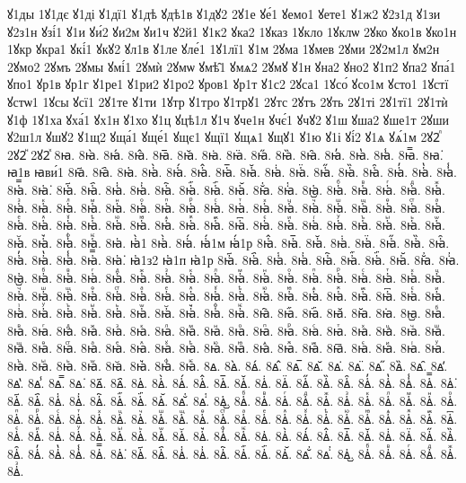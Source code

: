 {ꙋ1ды
1ꙋ1дє
ꙋ1ді
ꙋ1дї1
ꙋ1дѣ
ꙋдѣ1в
ꙋ1дꙋ2
2ꙋ1е
ꙋе́1
ꙋемо1
ꙋете1
ꙋ1ж2
ꙋ2з1д
ꙋ1зи
ꙋ2з1н
ꙋзі́1
ꙋ1и
ꙋи́2
ꙋи2м
ꙋи1ч
ꙋ2й1
ꙋ1к2
ꙋка2
1ꙋказ
1ꙋкло
1ꙋклѡ
2ꙋко
ꙋко1в
ꙋко1н
1ꙋкр
ꙋкра1
ꙋкі́1
ꙋкꙋ2
ꙋл1в
ꙋ1ле
ꙋле́1
1ꙋ1лї1
ꙋ1м
2ꙋма
1ꙋмев
2ꙋми
2ꙋ2м1л
ꙋм2н
2ꙋмо2
2ꙋмъ
2ꙋмы
ꙋмі́1
2ꙋмѝ
2ꙋмѡ
ꙋмѣ̑1
ꙋмѧ2
2ꙋмꙋ
ꙋ1н
ꙋна2
ꙋно2
ꙋ1п2
ꙋпа2
ꙋпа́1
ꙋпо1
ꙋр1в
ꙋр1г
ꙋ1ре1
ꙋ1ри2
ꙋ1ро2
ꙋров1
ꙋр1т
ꙋ1с2
2ꙋса1
1ꙋсо́
ꙋсо1м
ꙋсто1
1ꙋстї
ꙋстѡ1
1ꙋсы
ꙋсї1
2ꙋ1те
ꙋ1ти
1ꙋтр
ꙋ1тро
ꙋ1трꙋ1
2ꙋтс
2ꙋтъ
2ꙋть
2ꙋ1ті
2ꙋ1тї1
2ꙋ1тѝ
ꙋ1ф
1ꙋ1ха
ꙋха́1
ꙋх1н
ꙋ1хо
ꙋ1ц
ꙋцѣ1л
ꙋ1ч
ꙋче1н
ꙋчє́1
ꙋчꙋ2
ꙋ1ш
ꙋша2
ꙋше1т
2ꙋши
ꙋ2ш1л
ꙋшꙋ2
ꙋ1щ2
ꙋща́1
ꙋще́1
ꙋщє1
ꙋщї1
ꙋщѧ1
ꙋщꙋ1
ꙋ1ю
ꙋ1і
ꙋі́2
ꙋ1ѧ
ꙋѧ́1м
2ꙋ2ⷧ
2ꙋ2ⷩ
2ꙋ2ⷯ
8ꙗ.
8ꙗ̀.
8ꙗ́.
8ꙗ̂.
8ꙗ̅.
8ꙗ̆.
8ꙗ̇.
8ꙗ̈.
8ꙗ̋.
8ꙗ̏.
8ꙗ̑.
8ꙗ̓.
8ꙗ̔.
8ꙗ̾.
8ꙗ̿.
8ꙗ͘.
ꙗ1в
ꙗви́1
8ꙗ҃.
8ꙗ҄.
8ꙗ҅.
8ꙗ҅̀.
8ꙗ҅́.
8ꙗ҅̂.
8ꙗ҅̅.
8ꙗ҅̆.
8ꙗ҅̇.
8ꙗ҅̈.
8ꙗ҅̋.
8ꙗ҅̏.
8ꙗ҅̑.
8ꙗ҅̓.
8ꙗ҅̔.
8ꙗ҅̾.
8ꙗ҅̿.
8ꙗ҅͘.
8ꙗ҅҃.
8ꙗ҅҄.
8ꙗ҅҅.
8ꙗ҅҆.
8ꙗ҅҇.
8ꙗ҅᷀.
8ꙗ҅᷁.
8ꙗ҅᷶.
8ꙗ᷷҅.
8ꙗ᷸҅.
8ꙗ᷹҅.
8ꙗ҅ⷠ.
8ꙗ҅ⷡ.
8ꙗ҅ⷢ.
8ꙗ҅ⷣ.
8ꙗ҅ⷤ.
8ꙗ҅ⷥ.
8ꙗ҅ⷦ.
8ꙗ҅ⷧ.
8ꙗ҅ⷨ.
8ꙗ҅ⷩ.
8ꙗ҅ⷪ.
8ꙗ҅ⷫ.
8ꙗ҅ⷬ.
8ꙗ҅ⷭ.
8ꙗ҅ⷮ.
8ꙗ҅ⷯ.
8ꙗ҅ⷰ.
8ꙗ҅ⷱ.
8ꙗ҅ⷲ.
8ꙗ҅ⷳ.
8ꙗ҅ⷴ.
8ꙗ҅ⷵ.
8ꙗ҅ⷶ.
8ꙗ҅ⷷ.
8ꙗ҅ⷸ.
8ꙗ҅ⷹ.
8ꙗ҅ⷺ.
8ꙗ҅ⷻ.
8ꙗ҅ⷼ.
8ꙗ҅ⷽ.
8ꙗ҅ⷾ.
8ꙗ҅ⷿ.
8ꙗ҅꙯.
8ꙗ҅ꙴ.
8ꙗ҅ꙵ.
8ꙗ҅ꙶ.
8ꙗ҅ꙷ.
8ꙗ҅ꙸ.
8ꙗ҅ꙹ.
8ꙗ҅ꙺ.
8ꙗ҅ꙻ.
8ꙗ҅꙼.
8ꙗ҅꙽.
8ꙗ҅ꚞ.
8ꙗ҅ꚟ.
8ꙗ҆.
ꙗ҆̀1
8ꙗ҆̀.
8ꙗ҆́.
ꙗ҆́1м
ꙗ҆́1р
8ꙗ҆̂.
8ꙗ҆̅.
8ꙗ҆̆.
8ꙗ҆̇.
8ꙗ҆̈.
8ꙗ҆̋.
8ꙗ҆̏.
8ꙗ҆̑.
8ꙗ҆̓.
8ꙗ҆̔.
8ꙗ҆̾.
8ꙗ҆̿.
8ꙗ҆͘.
ꙗ҆1з2
ꙗ҆1п
ꙗ҆1р
8ꙗ҆҃.
8ꙗ҆҄.
8ꙗ҆҅.
8ꙗ҆҆.
8ꙗ҆҇.
8ꙗ҆᷀.
8ꙗ҆᷁.
8ꙗ҆᷶.
8ꙗ᷷҆.
8ꙗ᷸҆.
8ꙗ᷹҆.
8ꙗ҆ⷠ.
8ꙗ҆ⷡ.
8ꙗ҆ⷢ.
8ꙗ҆ⷣ.
8ꙗ҆ⷤ.
8ꙗ҆ⷥ.
8ꙗ҆ⷦ.
8ꙗ҆ⷧ.
8ꙗ҆ⷨ.
8ꙗ҆ⷩ.
8ꙗ҆ⷪ.
8ꙗ҆ⷫ.
8ꙗ҆ⷬ.
8ꙗ҆ⷭ.
8ꙗ҆ⷮ.
8ꙗ҆ⷯ.
8ꙗ҆ⷰ.
8ꙗ҆ⷱ.
8ꙗ҆ⷲ.
8ꙗ҆ⷳ.
8ꙗ҆ⷴ.
8ꙗ҆ⷵ.
8ꙗ҆ⷶ.
8ꙗ҆ⷷ.
8ꙗ҆ⷸ.
8ꙗ҆ⷹ.
8ꙗ҆ⷺ.
8ꙗ҆ⷻ.
8ꙗ҆ⷼ.
8ꙗ҆ⷽ.
8ꙗ҆ⷾ.
8ꙗ҆ⷿ.
8ꙗ҆꙯.
8ꙗ҆ꙴ.
8ꙗ҆ꙵ.
8ꙗ҆ꙶ.
8ꙗ҆ꙷ.
8ꙗ҆ꙸ.
8ꙗ҆ꙹ.
8ꙗ҆ꙺ.
8ꙗ҆ꙻ.
8ꙗ҆꙼.
8ꙗ҆꙽.
8ꙗ҆ꚞ.
8ꙗ҆ꚟ.
8ꙗ҇.
8ꙗ᷀.
8ꙗ᷁.
8ꙗ᷶.
8ꙗ᷷.
8ꙗ᷸.
8ꙗ᷹.
8ꙗⷠ.
8ꙗⷡ.
8ꙗⷢ.
8ꙗⷣ.
8ꙗⷤ.
8ꙗⷥ.
8ꙗⷦ.
8ꙗⷧ.
8ꙗⷨ.
8ꙗⷩ.
8ꙗⷪ.
8ꙗⷫ.
8ꙗⷬ.
8ꙗⷭ.
8ꙗⷮ.
8ꙗⷯ.
8ꙗⷰ.
8ꙗⷱ.
8ꙗⷲ.
8ꙗⷳ.
8ꙗⷴ.
8ꙗⷵ.
8ꙗⷶ.
8ꙗⷷ.
8ꙗⷸ.
8ꙗⷹ.
8ꙗⷺ.
8ꙗⷻ.
8ꙗⷼ.
8ꙗⷽ.
8ꙗⷾ.
8ꙗⷿ.
8ꙗ꙯.
8ꙗꙴ.
8ꙗꙵ.
8ꙗꙶ.
8ꙗꙷ.
8ꙗꙸ.
8ꙗꙹ.
8ꙗꙺ.
8ꙗꙻ.
8ꙗ꙼.
8ꙗ꙽.
8ꙗꚞ.
8ꙗꚟ.
8ꙙ.
8ꙙ̀.
8ꙙ́.
8ꙙ̂.
8ꙙ̅.
8ꙙ̆.
8ꙙ̇.
8ꙙ̈.
8ꙙ̋.
8ꙙ̏.
8ꙙ̑.
8ꙙ̓.
8ꙙ̔.
8ꙙ̾.
8ꙙ̿.
8ꙙ͘.
8ꙙ҃.
8ꙙ҄.
8ꙙ҅.
8ꙙ҅̀.
8ꙙ҅́.
8ꙙ҅̂.
8ꙙ҅̅.
8ꙙ҅̆.
8ꙙ҅̇.
8ꙙ҅̈.
8ꙙ҅̋.
8ꙙ҅̏.
8ꙙ҅̑.
8ꙙ҅̓.
8ꙙ҅̔.
8ꙙ҅̾.
8ꙙ҅̿.
8ꙙ҅͘.
8ꙙ҅҃.
8ꙙ҅҄.
8ꙙ҅҅.
8ꙙ҅҆.
8ꙙ҅҇.
8ꙙ҅᷀.
8ꙙ҅᷁.
8ꙙ҅᷶.
8ꙙ᷷҅.
8ꙙ᷸҅.
8ꙙ᷹҅.
8ꙙ҅ⷠ.
8ꙙ҅ⷡ.
8ꙙ҅ⷢ.
8ꙙ҅ⷣ.
8ꙙ҅ⷤ.
8ꙙ҅ⷥ.
8ꙙ҅ⷦ.
8ꙙ҅ⷧ.
8ꙙ҅ⷨ.
8ꙙ҅ⷩ.
8ꙙ҅ⷪ.
8ꙙ҅ⷫ.
8ꙙ҅ⷬ.
8ꙙ҅ⷭ.
8ꙙ҅ⷮ.
8ꙙ҅ⷯ.
8ꙙ҅ⷰ.
8ꙙ҅ⷱ.
8ꙙ҅ⷲ.
8ꙙ҅ⷳ.
8ꙙ҅ⷴ.
8ꙙ҅ⷵ.
8ꙙ҅ⷶ.
8ꙙ҅ⷷ.
8ꙙ҅ⷸ.
8ꙙ҅ⷹ.
8ꙙ҅ⷺ.
8ꙙ҅ⷻ.
8ꙙ҅ⷼ.
8ꙙ҅ⷽ.
8ꙙ҅ⷾ.
8ꙙ҅ⷿ.
8ꙙ҅꙯.
8ꙙ҅ꙴ.
8ꙙ҅ꙵ.
8ꙙ҅ꙶ.
8ꙙ҅ꙷ.
8ꙙ҅ꙸ.
8ꙙ҅ꙹ.
8ꙙ҅ꙺ.
8ꙙ҅ꙻ.
8ꙙ҅꙼.
8ꙙ҅꙽.
8ꙙ҅ꚞ.
8ꙙ҅ꚟ.
8ꙙ҆.
8ꙙ҆̀.
8ꙙ҆́.
8ꙙ҆̂.
8ꙙ҆̅.
8ꙙ҆̆.
8ꙙ҆̇.
8ꙙ҆̈.
8ꙙ҆̋.
8ꙙ҆̏.
8ꙙ҆̑.
8ꙙ҆̓.
8ꙙ҆̔.
8ꙙ҆̾.
8ꙙ҆̿.
8ꙙ҆͘.
8ꙙ҆҃.
8ꙙ҆҄.
8ꙙ҆҅.
8ꙙ҆҆.
8ꙙ҆҇.
8ꙙ҆᷀.
8ꙙ҆᷁.
8ꙙ҆᷶.
8ꙙ᷷҆.
8ꙙ᷸҆.
8ꙙ᷹҆.
8ꙙ҆ⷠ.
8ꙙ҆ⷡ.
8ꙙ҆ⷢ.
8ꙙ҆ⷣ.
8ꙙ҆ⷤ.
8ꙙ҆ⷥ.
}
